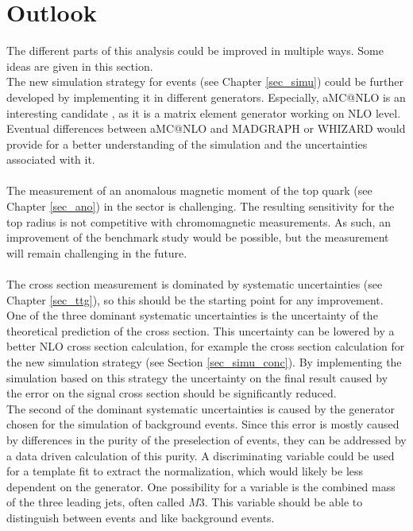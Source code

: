 \chapter{Outlook}
\label{sec_out}

The different parts of this analysis could be improved in multiple ways. Some ideas are given in this section. \\
The new simulation strategy for \ttgamma events (see Chapter \ref{sec_simu}) could be further developed by implementing it in different generators. Especially, aMC@NLO is an interesting candidate \cite{Alwall:2014hca}, as it is a matrix element generator working on NLO level. Eventual differences between aMC@NLO and MADGRAPH or WHIZARD would provide for a better understanding of the simulation and the uncertainties associated with it. \\ 
 \\
The measurement of an anomalous magnetic moment of the top quark (see Chapter \ref{sec_ano}) in the \ttgamma sector is challenging. The resulting sensitivity for the top radius is not competitive with chromomagnetic measurements. As such, an improvement of the benchmark study would be possible, but the measurement will remain challenging in the future. \\
\\
The \ttgamma cross section measurement is dominated by systematic uncertainties (see Chapter \ref{sec_ttg}), so this should be the starting point for any improvement. One of the three dominant systematic uncertainties is the uncertainty of the theoretical prediction of the \ttgamma cross section. This uncertainty can be lowered by a better NLO cross section calculation, for example the cross section calculation for the new simulation strategy (see Section \ref{sec_simu_conc}). By implementing the \ttgamma simulation based on this strategy the uncertainty on the final result caused by the error on the signal cross section should be significantly reduced.\\
The second of the dominant systematic uncertainties is caused by the generator chosen for the simulation of \ttbar background events. Since this error is mostly caused by differences in the purity of the preselection of \ttbar events, they can be addressed by a data driven calculation of this purity. A discriminating variable could be used for a template fit to extract the normalization, which would likely be less dependent on the generator. One possibility for a variable is the combined mass of the three leading jets, often called $M3$. This variable should be able to distinguish between \ttbar events and \ttbar like background events.\\

